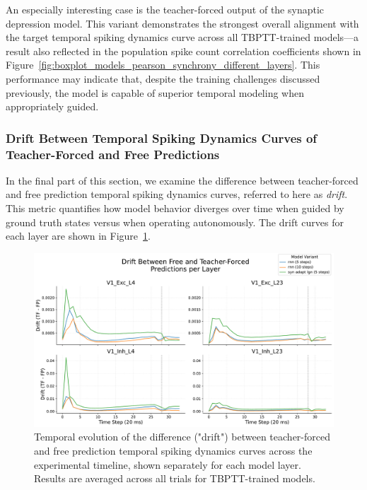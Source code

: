 An especially interesting case is the teacher-forced output of the synaptic depression model. This variant demonstrates the strongest overall alignment with the target temporal spiking dynamics curve across all TBPTT-trained models—a result also reflected in the population spike count correlation coefficients shown in Figure~\ref{fig:boxplot_models_pearson_synchrony_different_layers}. This performance may indicate that, despite the training challenges discussed previously, the model is capable of superior temporal modeling when appropriately guided.

\subsubsection{Drift Between Temporal Spiking Dynamics Curves of Teacher-Forced and Free Predictions}
\label{subsubsec:drift_teacher_free_synchrony}

In the final part of this section, we examine the difference between teacher-forced and free prediction temporal spiking dynamics curves, referred to here as \emph{drift}. This metric quantifies how model behavior diverges over time when guided by ground truth states versus when operating autonomously. The drift curves for each layer are shown in Figure~\ref{fig:teacher_forced_free_drift}.

\begin{figure}
    \centering
    \includegraphics[width=\linewidth]{img/plots/temporal_drift_forced_free.pdf}
    \caption{Temporal evolution of the difference ("drift") between teacher-forced and free prediction temporal spiking dynamics curves across the experimental timeline, shown separately for each model layer. Results are averaged across all trials for TBPTT-trained models.}
    \label{fig:teacher_forced_free_drift}
\end{figure}

